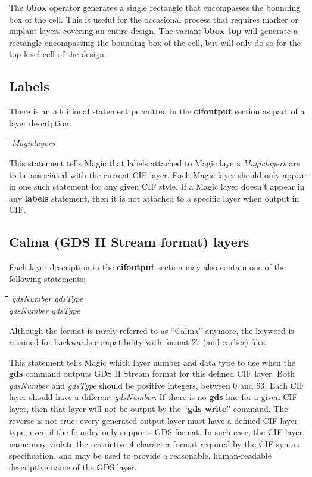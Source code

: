 \documentclass[letterpaper,twoside,12pt]{article}
\def\hinch{\hspace*{0.5in}}
\def\starti{\begin{center}\begin{tabbing}\hinch\=\hinch\=\hinch\=\hinch\=\kill}
\def\endi{\end{tabbing}\end{center}}
\def\ii{\>\>\>}
\begin{document}
The {\bfseries bbox} operator generates a single rectangle that encompasses
the bounding box of the cell.  This is useful for the occasional process
that requires marker or implant layers covering an entire design.  The
variant {\bfseries bbox top} will generate a rectangle encompassing the
bounding box of the cell, but will only do so for the top-level cell of the
design.

\subsection{Labels}

There is an additional statement permitted in the {\bfseries cifoutput}
section as part of a layer description:

\starti
   \ii {\bfseries labels} {\itshape Magiclayers}
\endi

This statement tells Magic that labels attached to Magic layers
{\itshape Magiclayers} are to be associated with the current CIF layer.
Each Magic layer should only appear in one such statement for
any given CIF style.  If a Magic layer doesn't appear in any
{\bfseries labels} statement, then it is not attached to a specific
layer when output in CIF.

\subsection{Calma (GDS II Stream format) layers}

Each layer description in the {\bfseries cifoutput} section may also
contain one of the following statements:

\starti
   \ii {\bfseries gds} {\itshape gdsNumber} {\itshape gdsType} \\
   \ii {\bfseries calma} {\itshape gdsNumber} {\itshape gdsType}
\endi

Although the format is rarely referred to as ``Calma'' anymore, the
keyword is retained for backwards compatibility with format 27 (and
earlier) files.

This statement tells Magic which layer number and data type
to use when the {\bfseries gds} command outputs GDS II Stream format
for this defined CIF layer.
Both {\itshape gdsNumber} and {\itshape gdsType} should be positive
integers, between 0 and 63.
Each CIF layer should have a different {\itshape gdsNumber}.
If there is no {\bfseries gds} line for a given CIF layer, then
that layer will not be output by the ``{\bfseries gds write}'' command.
The reverse is not true:  every generated output layer must have a
defined CIF layer type, even if the foundry only supports GDS format.
In such case, the CIF layer name may violate the restrictive 4-character
format required by the CIF syntax specification, and may be used to
provide a reasonable, human-readable descriptive name of the GDS layer.
\end{document}
